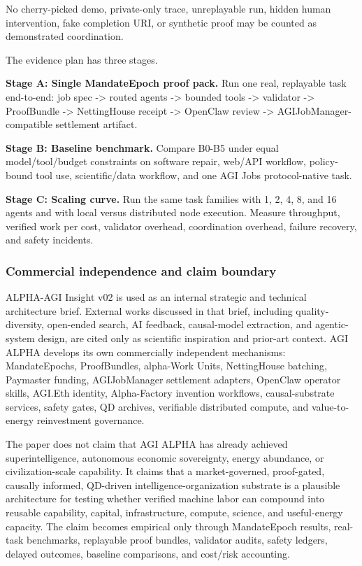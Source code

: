 \documentclass[
  11pt,
]{article}
\begin{document}
No cherry-picked demo, private-only trace, unreplayable run, hidden
human intervention, fake completion URI, or synthetic proof may be
counted as demonstrated coordination.

The evidence plan has three stages.

\textbf{Stage A: Single MandateEpoch proof pack.} Run one real,
replayable task end-to-end: job spec -\textgreater{} routed agents
-\textgreater{} bounded tools -\textgreater{} validator -\textgreater{}
ProofBundle -\textgreater{} NettingHouse receipt -\textgreater{}
OpenClaw review -\textgreater{} AGIJobManager-compatible settlement
artifact.

\textbf{Stage B: Baseline benchmark.} Compare B0-B5 under equal
model/tool/budget constraints on software repair, web/API workflow,
policy-bound tool use, scientific/data workflow, and one AGI Jobs
protocol-native task.

\textbf{Stage C: Scaling curve.} Run the same task families with 1, 2,
4, 8, and 16 agents and with local versus distributed node execution.
Measure throughput, verified work per cost, validator overhead,
coordination overhead, failure recovery, and safety incidents.

\subsubsection{Commercial independence and claim
boundary}\label{commercial-independence-and-claim-boundary}

ALPHA-AGI Insight v02 is used as an internal strategic and technical
architecture brief. External works discussed in that brief, including
quality-diversity, open-ended search, AI feedback, causal-model
extraction, and agentic-system design, are cited only as scientific
inspiration and prior-art context. AGI ALPHA develops its own
commercially independent mechanisms: MandateEpochs, ProofBundles,
alpha-Work Units, NettingHouse batching, Paymaster funding,
AGIJobManager settlement adapters, OpenClaw operator skills, AGI.Eth
identity, Alpha-Factory invention workflows, causal-substrate services,
safety gates, QD archives, verifiable distributed compute, and
value-to-energy reinvestment governance.

The paper does not claim that AGI ALPHA has already achieved
superintelligence, autonomous economic sovereignty, energy abundance, or
civilization-scale capability. It claims that a market-governed,
proof-gated, causally informed, QD-driven intelligence-organization
substrate is a plausible architecture for testing whether verified
machine labor can compound into reusable capability, capital,
infrastructure, compute, science, and useful-energy capacity. The claim
becomes empirical only through MandateEpoch results, real-task
benchmarks, replayable proof bundles, validator audits, safety ledgers,
delayed outcomes, baseline comparisons, and cost/risk accounting.
\end{document}
